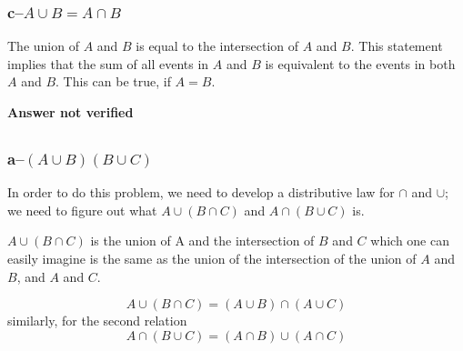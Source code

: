 \subsubsection{c--$A \cup B = A \cap B$}

The union of $A$ and $B$ is equal to the intersection of $A$ and $B$.  This statement implies that the sum of all events in $A$ and $B$ is equivalent to the events in both $A$ and $B$.  This can be true, if $A=B$.

\textbf{Answer not verified}


\subsection{}
\subsubsection{a--$(A \cup B)(B \cup C)$}

In order to do this problem, we need to develop a distributive law for $\cap$ and $\cup$; we need to figure out what $A \cup (B \cap C)$ and $A \cap (B \cup C)$ is.

$A \cup (B \cap C)$ is the union of A and the intersection of $B$ and $C$ which one can easily imagine is the same as the union of the intersection of the union of $A$ and $B$, and $A$ and $C$.  

\begin{equation}
	A \cup (B \cap C) = (A \cup B) \cap (A \cup C)
\end{equation}
similarly, for the second relation
\begin{equation}
	A \cap (B \cup C) = (A \cap B) \cup (A \cap C)
\end{equation}

